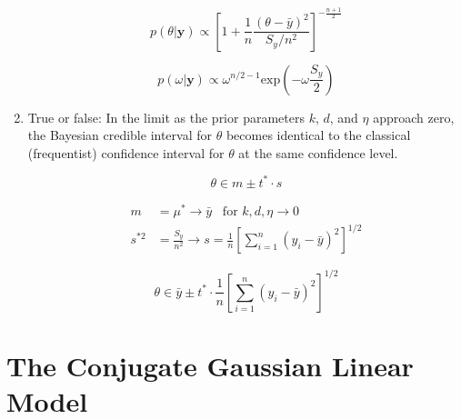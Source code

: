 \documentclass[10pt]{article}
\newcommand{\by}{\mathbf{y}}
\begin{document}
\begin{enumerate}[label=(\Alph*)]
        $$p(\theta|\by) \propto \left[1 + \frac{1}{n} \frac{(\theta - \bar{y})^2}{S_y/n^2} \right]^{-\frac{n+1}{2}}$$

        $$p(\omega|\by) \propto \omega^{n/2 -1} \text{exp}\left( -\omega \frac{S_y}{2}\right)$$

      \item True or false: In the limit as the prior parameters $k$, $d$, and $\eta$ approach zero, the Bayesian credible interval for $\theta$ becomes identical to the classical (frequentist) confidence interval for $\theta$ at the same confidence level.

        $$\theta \in m \pm t^* \cdot s $$

        \begin{align*}
          m &= \mu^* \rightarrow \bar{y} \hspace{10pt} \text{for $k, d, \eta \to 0$} \\
          s^{*2} &= \frac{S_y}{n^2} \rightarrow s = \frac{1}{n} \left[\sum_{i=1}^n(y_i - \bar{y})^2 \right]^{1/2}
        \end{align*}

        $$\theta \in \bar{y} \pm t^* \cdot \frac{1}{n} \left[\sum_{i=1}^n(y_i - \bar{y})^2 \right]^{1/2}$$
    \end{enumerate}

    \section*{The Conjugate Gaussian Linear Model}
\end{document}
